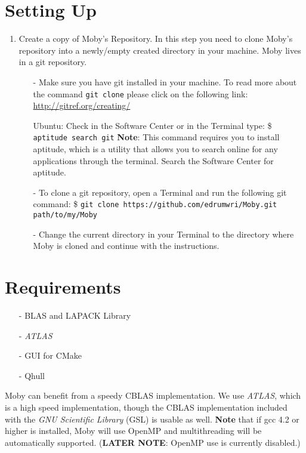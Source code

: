 \documentclass[11pt, letterpaper]{article}
\begin{document}
\section{Setting Up}
\begin{enumerate}
\item Create a copy of Moby's Repository.  In this step you need to clone Moby's repository into a newly/empty created directory in your machine.  Moby lives in a git repository.
\begin{itemize}
\item[-]Make sure you have git installed in your machine.  To read more about the command \texttt{git clone} please click on the following link: \url{http://gitref.org/creating/}

Ubuntu: Check in the Software Center or in the Terminal type: \$ \texttt{aptitude search git}
\newline
{\bfseries Note}: This command requires you to install aptitude, which is a utility that allows you to search online for any applications through the terminal.  Search the Software Center for aptitude.

\item[-]To clone a git repository, open a Terminal and run the following git command:
\$ \texttt{git clone https://github.com/edrumwri/Moby.git\\ path/to/my/Moby}

\item[-]Change the current directory in your Terminal to the directory where Moby is cloned and continue with the instructions.
\end{itemize}
\end{enumerate}

\section{Requirements}
\begin{itemize}
\item[-] BLAS and LAPACK Library
\item[-] \emph{ATLAS}
\item[-] GUI for CMake
\item[-] Qhull
\end{itemize}

Moby can benefit from a speedy CBLAS implementation. We use \emph{ATLAS}, which is a high speed implementation, though the CBLAS implementation included with the \emph{GNU Scientific Library} (GSL) is usable as well. {\bfseries Note} that if gcc 4.2 or higher is installed, Moby will use OpenMP and multithreading will be automatically supported. ({\bfseries LATER NOTE}: OpenMP use is currently disabled.)
\end{document}

